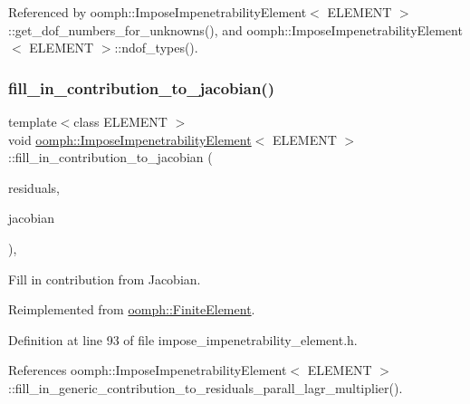 Referenced by oomph\+::\+Impose\+Impenetrability\+Element$<$ E\+L\+E\+M\+E\+N\+T $>$\+::get\+\_\+dof\+\_\+numbers\+\_\+for\+\_\+unknowns(), and oomph\+::\+Impose\+Impenetrability\+Element$<$ E\+L\+E\+M\+E\+N\+T $>$\+::ndof\+\_\+types().

\mbox{\label{classoomph_1_1ImposeImpenetrabilityElement_a9a53b713347bdb2b9c04692ea708eb01}} 
\subsubsection{\texorpdfstring{fill\+\_\+in\+\_\+contribution\+\_\+to\+\_\+jacobian()}{fill\_in\_contribution\_to\_jacobian()}}
{\footnotesize\ttfamily template$<$class E\+L\+E\+M\+E\+NT $>$ \\
void \hyperlink{classoomph_1_1ImposeImpenetrabilityElement}{oomph\+::\+Impose\+Impenetrability\+Element}$<$ E\+L\+E\+M\+E\+NT $>$\+::fill\+\_\+in\+\_\+contribution\+\_\+to\+\_\+jacobian (\begin{DoxyParamCaption}\item[{\hyperlink{classoomph_1_1Vector}{Vector}$<$ double $>$ \&}]{residuals,  }\item[{\hyperlink{classoomph_1_1DenseMatrix}{Dense\+Matrix}$<$ double $>$ \&}]{jacobian }\end{DoxyParamCaption})\hspace{0.3cm}{\ttfamily [inline]}, {\ttfamily [virtual]}}



Fill in contribution from Jacobian. 



Reimplemented from \hyperlink{classoomph_1_1FiniteElement_a0ae7af222af38a0d53bf283dc85bdfea}{oomph\+::\+Finite\+Element}.



Definition at line 93 of file impose\+\_\+impenetrability\+\_\+element.\+h.



References oomph\+::\+Impose\+Impenetrability\+Element$<$ E\+L\+E\+M\+E\+N\+T $>$\+::fill\+\_\+in\+\_\+generic\+\_\+contribution\+\_\+to\+\_\+residuals\+\_\+parall\+\_\+lagr\+\_\+multiplier().

